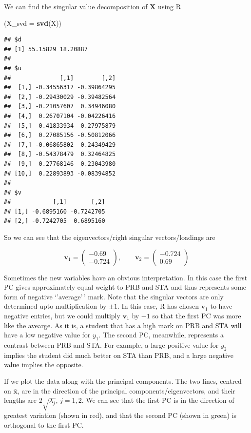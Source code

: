 \documentclass[
]{book}
\newenvironment{Shaded}{\begin{snugshade}}{\end{snugshade}}
\newcommand{\AttributeTok}[1]{\textcolor[rgb]{0.13,0.29,0.53}{#1}}
\newcommand{\FunctionTok}[1]{\textcolor[rgb]{0.13,0.29,0.53}{\textbf{#1}}}
\newcommand{\NormalTok}[1]{#1}
\theoremstyle{definition}
\theoremstyle{definition}
\theoremstyle{definition}
\theoremstyle{definition}
\theoremstyle{remark}
\begin{document}
We can find the singular value decomposition of \(\mathbf X\) using R

\begin{Shaded}
\begin{Highlighting}[]
\NormalTok{(}\AttributeTok{X\_svd =} \FunctionTok{svd}\NormalTok{(X))}
\end{Highlighting}
\end{Shaded}

\begin{verbatim}
## $d
## [1] 55.15829 18.20887
## 
## $u
##              [,1]        [,2]
##  [1,] -0.34556317 -0.39864295
##  [2,] -0.29430029 -0.39482564
##  [3,] -0.21057607  0.34946080
##  [4,]  0.26707104 -0.04226416
##  [5,]  0.41833934  0.27975879
##  [6,]  0.27085156 -0.50812066
##  [7,] -0.06865802  0.24349429
##  [8,] -0.54378479  0.32464825
##  [9,]  0.27768146  0.23043980
## [10,]  0.22893893 -0.08394852
## 
## $v
##            [,1]       [,2]
## [1,] -0.6895160 -0.7242705
## [2,] -0.7242705  0.6895160
\end{verbatim}

So we can see that the eigenvectors/right singular vectors/loadings are

\[\mathbf v_1=\begin{pmatrix} -0.69 \\ -0.724 \end{pmatrix},\qquad \mathbf v_2=\begin{pmatrix} -0.724 \\ 0.69 \end{pmatrix}\]

Sometimes the new variables have an obvious interpretation. In this case the first PC gives approximately equal weight to PRB and STA and thus represents some form of negative `'average'\,' mark. Note that the singular vectors are only determined upto multiplication by \(\pm 1\). In this case, R has chosen \(\mathbf v_1\) to have negative entries, but we could multiply \(\mathbf v_1\) by \(-1\) so that the first PC was more like the avearge.
As it is, a student that has a high mark on PRB and STA will have a low negative value for \(y_1\). The second PC, meanwhile, represents a contrast between PRB and STA. For example, a large positive value for \(y_2\) implies the student did much better on STA than PRB, and a large negative value implies the opposite.

If we plot the data along with the principal components. The two lines, centred on \(\bar{\mathbf x}\), are in the direction of the principal components/eigenvectors, and their lengths are \(2 \sqrt{\lambda_j}\), \(j=1,2\).
We can see that the first PC is in the direction of greatest variation (shown in red), and that the second PC (shown in green) is orthogonal to the first PC.
\end{document}
